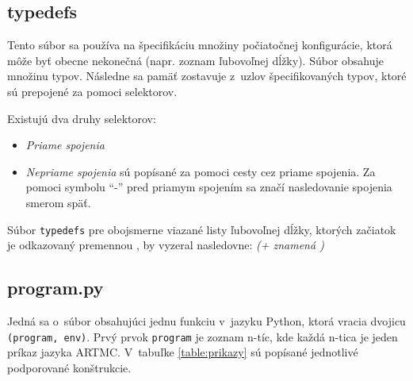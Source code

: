 \subsection{typedefs}
Tento súbor sa používa na špecifikáciu množiny počiatočnej konfigurácie, ktorá môže byť obecne nekonečná (napr. zoznam ľubovoľnej dĺžky). Súbor obsahuje množinu typov. Následne sa pamäť zostavuje z~uzlov špecifikovaných typov, ktoré sú prepojené za pomoci selektorov.
\newpage

Existujú dva druhy selektorov:
\begin{itemize}
\item \textit{Priame spojenia}
\item \textit{Nepriame spojenia} sú popísané za pomoci cesty cez priame spojenia. Za pomoci symbolu ``-'' pred priamym spojením sa značí nasledovanie spojenia smerom späť.
\end{itemize}

Súbor \texttt{typedefs} pre obojsmerne viazané listy ľubovoľnej dĺžky, ktorých začiatok je odkazovaný premennou , by vyzeral nasledovne: \textit{(+ znamená )}


\subsection{program.py}
Jedná sa o~súbor obsahujúci jednu funkciu v~jazyku Python, ktorá vracia dvojicu \texttt{(program, env)}.
Prvý prvok \texttt{program} je zoznam n-tíc, kde každá n-tica je jeden príkaz jazyka ARTMC. V~tabuľke \ref{table:prikazy} sú popísané jednotlivé podporované konštrukcie.

